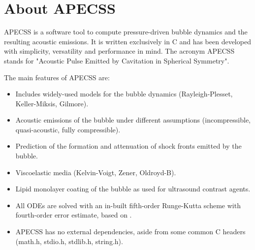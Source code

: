 \chapter{About APECSS}

APECSS is a software tool to compute pressure-driven bubble dynamics and the resulting acoustic emissions. It is written exclusively in C and has been developed with simplicity, versatility and performance in mind. The acronym APECSS stands for "Acoustic Pulse Emitted by Cavitation in Spherical Symmetry".

The main features of APECSS are:\vspace{-1em}
\begin{itemize}[noitemsep]
\item Includes widely-used models for the bubble dynamics (Rayleigh-Plesset, Keller-Miksis, Gilmore).
\item Acoustic emissions of the bubble under different assumptions (incompressible, quasi-acoustic, fully compressible).
\item Prediction of the formation and attenuation of shock fronts emitted by the bubble.
\item Viscoelastic media (Kelvin-Voigt, Zener, Oldroyd-B).
\item Lipid monolayer coating of the bubble as used for ultrasound contrast agents.
\item All ODEs are solved with an in-built fifth-order Runge-Kutta scheme with fourth-order error estimate, based on \citet{Dormand1980}.
\item APECSS has no external dependencies, aside from some common C headers (math.h, stdio.h, stdlib.h, string.h).
\end{itemize}

